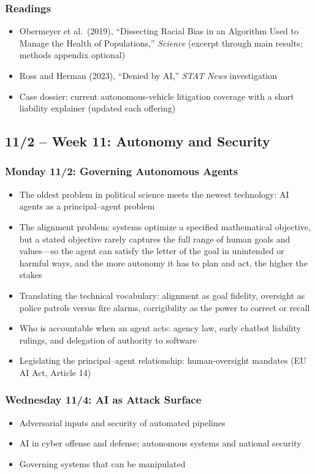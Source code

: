 \documentclass[12pt]{article}
\begin{document}
    \subsubsection*{Readings}
        \begin{itemize}
            \item Obermeyer et al.\ (2019), ``Dissecting Racial Bias in an Algorithm Used to Manage the Health of Populations,'' \emph{Science} (excerpt through main results; methods appendix optional)
            \item Ross and Herman (2023), ``Denied by AI,'' \emph{STAT News} investigation
            \item Case dossier: current autonomous-vehicle litigation coverage with a short liability explainer (updated each offering)
        \end{itemize}

\subsection*{11/2 -- Week 11: Autonomy and Security}
    \subsubsection*{Monday 11/2: Governing Autonomous Agents}
        \begin{itemize}
            \item The oldest problem in political science meets the newest technology: AI agents as a principal--agent problem
            \item The alignment problem: systems optimize a specified mathematical objective, but a stated objective rarely captures the full range of human goals and values---so the agent can satisfy the letter of the goal in unintended or harmful ways, and the more autonomy it has to plan and act, the higher the stakes
            \item Translating the technical vocabulary: alignment as goal fidelity, oversight as police patrols versus fire alarms, corrigibility as the power to correct or recall
            \item Who is accountable when an agent acts: agency law, early chatbot liability rulings, and delegation of authority to software
            \item Legislating the principal--agent relationship: human-oversight mandates (EU AI Act, Article 14)
        \end{itemize}
    \subsubsection*{Wednesday 11/4: AI as Attack Surface}
        \begin{itemize}
            \item Adversarial inputs and security of automated pipelines
            \item AI in cyber offense and defense; autonomous systems and national security
            \item Governing systems that can be manipulated
        \end{itemize}
\end{document}
